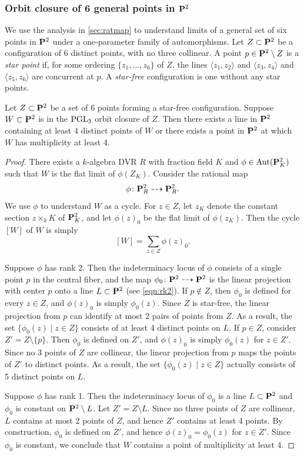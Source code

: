 \documentclass[11pt,reqno, letterpaper]{amsart}
\renewcommand{\k}{k}
\numberwithin{equation}{section}
\begin{document}
\subsubsection{Orbit closure of 6 general points in $\P^2$}\label{sec:orb6}
We use the analysis in \autoref{sec:ratmap} to understand limits of a general set of six points in $\P^2$ under a one-parameter family of automorphisms.
Let $Z \subset \P^2$ be a configuration of 6 distinct points, with no three collinear.
A point $p \in \P^2 \setminus Z$ is a \emph{star point} if, for some ordering $\{z_1, \dots, z_6\}$ of $Z$, the lines $\langle z_1, z_2 \rangle$ and $\langle  z_3, z_4 \rangle$ and $\langle  z_5, z_6 \rangle$ are concurrent at $p$.
A \emph{star-free} configuration is one without any star points.

\begin{proposition}\label{prop:limit4}
  Let $Z \subset \P^2$ be a set of 6 points forming a star-free configuration.
  Suppose $W \subset \P^2$ is in the $\PGL_3$ orbit closure of $Z$.
  Then there exists a line in $\P^2$ containing at least 4 distinct points of $W$ or there exists a point in $\P^2$ at which $W$ has multiplicity at least 4.
\end{proposition}
\begin{proof}
  There exists a $\k$-algebra DVR $R$ with fraction field $K$ and $\phi \in \Aut(\P^2_K)$ such that $W$ is the flat limit of $\phi(Z_K)$.
  Consider the rational map
  \[ \phi \colon \P^2_R \dashrightarrow \P^2_R.\]
  We use $\phi$ to understand $W$ as a cycle.
  For $z \in Z$, let $z_K$ denote the constant section $z \times_k K$ of $\P^2_K$, and let $\phi(z)_0$ be the flat limit of $\phi(z_K)$.
  Then the cycle $[W]$ of $W$ is simply
  \[ [W] = \sum_{z \in Z} \phi(z)_0.\]

  Suppose $\phi$ has rank 2.
  Then the indeterminacy locus of $\phi$ consists of a single point $p$ in the central fiber, and the map $\phi_0 \colon \P^2 \dashrightarrow \P^2$
  is the linear projection with center $p$ onto a line $L \subset \P^2$ (see \eqref{eqn:rk2}).
  If $p \not \in Z$, then  $\phi_0$ is defined for every $z \in Z$, and $\phi(z)_0$ is simply $\phi_0(z)$.
  Since $Z$ is star-free, the linear projection from $p$ can identify at most 2 pairs of points from $Z$.
  As a result, the set $\{\phi_0(z) \mid z \in Z\}$ consists of at least 4 distinct points on $L$.
  If $p \in Z$, consider $Z' = Z \setminus \{p\}$.
  Then $\phi_0$ is defined on $Z'$, and $\phi(z)_0$ is simply $\phi_0(z)$ for $z \in Z'$.
  Since no 3 points of $Z$ are collinear, the linear projection from $p$ maps the points of $Z'$ to distinct points.
  As a result, the set $\{\phi_0(z) \mid z \in Z\}$ actually consists of 5 distinct points on $L$.

  Suppose $\phi$ has rank 1.
  Then the indeterminacy locus of $\phi_0$ is a line $L \subset \P^2$ and $\phi_0$ is constant on $\P^2 \setminus L$.
  Let $Z' = Z \setminus L$.
  Since no three points of $Z$ are collinear, $L$ contains at most 2 points of $Z$, and hence $Z'$ contains at least 4 points.
  By construction, $\phi_0$ is defined on $Z'$, and hence $\phi(z)_0 = \phi_0(z)$ for $z \in Z'$.
  Since $\phi_0$ is constant, we conclude that $W$ contains a point of multiplicity at least 4.
\end{proof}
\end{document}
